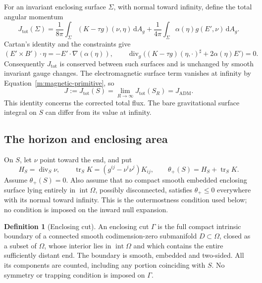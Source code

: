 \documentclass[11pt]{article}
\numberwithin{equation}{section}
\theoremstyle{definition}
\newtheorem{definition}[theorem]{Definition}
\theoremstyle{remark}
\newcommand{\dd}{\mathrm d}
\DeclareMathOperator{\tr}{tr}
\DeclareMathOperator{\divg}{div}
\begin{document}
For an invariant enclosing surface \(\Sigma\), with normal toward infinity,
define the total angular momentum
\begin{equation}\label{m:total-angular}
 J_{\mathrm{tot}}(\Sigma)=\frac1{8\pi}\int_\Sigma(K-\tau g)(\nu,\eta)\,\dd A_g
  +\frac1{4\pi}\int_\Sigma\alpha(\eta)g(E',\nu)\,\dd A_g.
\end{equation}
Cartan's identity and the constraints give
\[
 (E'\mathbin\times B')\cdot\eta=-E'\cdot\nabla(\alpha(\eta)),\qquad
 \divg_g\bigl((K-\tau g)(\eta,\cdot)^\sharp+2\alpha(\eta)E'\bigr)=0.
\]
Consequently \(J_{\mathrm{tot}}\) is conserved between such surfaces and is
unchanged by smooth invariant gauge changes. The electromagnetic surface
term vanishes at infinity by Equation~\eqref{m:magnetic-primitive}, so
\begin{equation}\label{m:J}
 J:=J_{\mathrm{tot}}(S)=\lim_{R\to\infty}J_{\mathrm{tot}}(S_R)=J_{\mathrm{ADM}}.
\end{equation}
This identity concerns the corrected total flux. The bare gravitational
surface integral on \(S\) can differ from its value at infinity.

\subsection{The horizon and enclosing area}

On \(S\), let \(\nu\) point toward the end, and put
\begin{equation}\label{m:expansion}
 H_S=\divg_S\nu,\qquad
 \tr_SK=(g^{ij}-\nu^i\nu^j)K_{ij},\qquad
 \theta_+(S)=H_S+\tr_SK.
\end{equation}
Assume \(\theta_+(S)=0\). Also assume that no compact smooth embedded
enclosing surface lying entirely in \(\operatorname{int}\Omega\), possibly
disconnected, satisfies \(\theta_+\le0\) everywhere with its normal toward
infinity. This is the outermostness condition used below; no condition is
imposed on the inward null expansion.

\begin{definition}[Enclosing cut]\label{m:cut}
An enclosing cut \(\Gamma\) is the full compact intrinsic boundary of a
connected smooth codimension-zero submanifold \(D\subset\Omega\), closed
as a subset of \(\Omega\), whose interior lies in
\(\operatorname{int}\Omega\) and which contains the entire sufficiently
distant end. The boundary is smooth, embedded and two-sided. All its
components are counted, including any portion coinciding with \(S\).
No symmetry or trapping condition is imposed on \(\Gamma\).
\end{definition}
\end{document}
